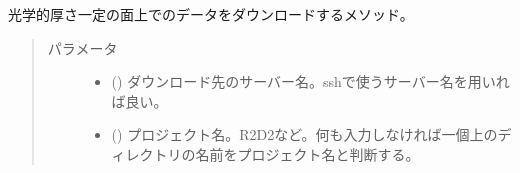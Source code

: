 \documentclass[letterpaper,10pt,dvipdfmx,report]{sphinxmanual}
\begin{document}
\begin{fulllineitems}
\label{\detokenize{io:R2D2.R2D2_data.sync_tau}}
光学的厚さ一定の面上でのデータをダウンロードするメソッド。
\begin{quote}\begin{description}
\item[{パラメータ}] \leavevmode\begin{itemize}
\item {} 
 () \sphinxhyphen{}\sphinxhyphen{} ダウンロード先のサーバー名。sshで使うサーバー名を用いれば良い。

\item {} 
 () \sphinxhyphen{}\sphinxhyphen{} プロジェクト名。\textquotesingle{}R2D2\textquotesingle{}など。何も入力しなければ一個上のディレクトリの名前をプロジェクト名と判断する。

\end{itemize}

\end{description}\end{quote}

\end{fulllineitems}

\end{document}
